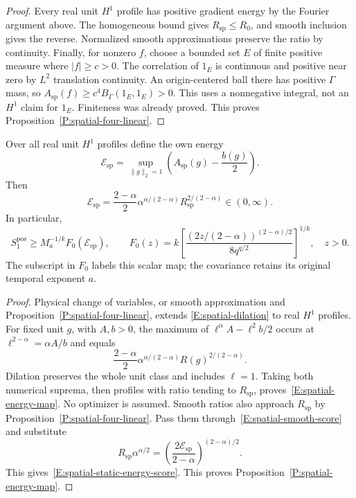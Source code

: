 \begin{proof}
  Every real unit $H^1$ profile has positive gradient energy by
  the Fourier argument above. The homogeneous bound gives
  $R_{\mathrm{sp}}\le R_0$, and smooth inclusion gives the reverse.
  Normalized smooth approximations preserve the ratio by continuity.
  Finally, for nonzero $f$, choose a bounded set $E$ of finite
  positive measure where $|f|\ge c>0$.
  The correlation of $1_E$ is continuous and positive near zero
  by $L^2$ translation continuity. An origin-centered ball there
  has positive $\Gamma$ mass, so
  $A_{\mathrm{sp}}(f)\ge c^4B_\Gamma(1_E,1_E)>0$.
  This uses a nonnegative integral, not an $H^1$ claim for $1_E$.
  Finiteness was already proved.
  This proves Proposition~\ref{P:spatial-four-linear}.
\end{proof}

\begin{proposition}
  \label{P:spatial-energy-map}
  Over all real unit $H^1$ profiles define the own energy
  \[
    \mathcal E_{\mathrm{sp}}
    =\sup_{\|g\|_2=1}
    \left(A_{\mathrm{sp}}(g)-\frac{b(g)}2\right).
  \]
  Then
  \begin{equation}\label{E:spatial-energy-map}
    \mathcal E_{\mathrm{sp}}
    =\frac{2-\alpha}{2}\alpha^{\alpha/(2-\alpha)}
    R_{\mathrm{sp}}^{2/(2-\alpha)}
    \in(0,\infty).
  \end{equation}
  In particular,
  \begin{equation}\label{E:spatial-static-energy-score}
    S_1^{\mathrm{pos}}\ge M_a^{-1/k}F_0(\mathcal E_{\mathrm{sp}}),
    \qquad
    F_0(z)=k\left[
    \frac{(2z/(2-\alpha))^{(2-\alpha)/2}}{8q^{q/2}}
    \right]^{1/k},\quad z>0.
  \end{equation}
  The subscript in $F_0$ labels this scalar map; the covariance
  retains its original temporal exponent $a$.
\end{proposition}

\begin{proof}
  Physical change of variables, or smooth approximation and
  Proposition~\ref{P:spatial-four-linear}, extends
  \eqref{E:spatial-dilation} to real $H^1$ profiles.
  For fixed unit $g$, with $A,b>0$, the maximum of
  $\ell^\alpha A-\ell^2b/2$ occurs at
  $\ell^{2-\alpha}=\alpha A/b$ and equals
  \[
    \frac{2-\alpha}{2}\alpha^{\alpha/(2-\alpha)}
    R(g)^{2/(2-\alpha)}.
  \]
  Dilation preserves the whole unit class and includes $\ell=1$.
  Taking both numerical suprema, then profiles with ratio tending
  to $R_{\mathrm{sp}}$, proves~\eqref{E:spatial-energy-map}.
  No optimizer is assumed.
  Smooth ratios also approach $R_{\mathrm{sp}}$ by
  Proposition~\ref{P:spatial-four-linear}.
  Pass them through~\eqref{E:spatial-smooth-score} and substitute
  \[
    R_{\mathrm{sp}}\alpha^{\alpha/2}
    =\left(\frac{2\mathcal E_{\mathrm{sp}}}{2-\alpha}
    \right)^{(2-\alpha)/2}.
  \]
  This gives~\eqref{E:spatial-static-energy-score}.
  This proves Proposition~\ref{P:spatial-energy-map}.
\end{proof}

